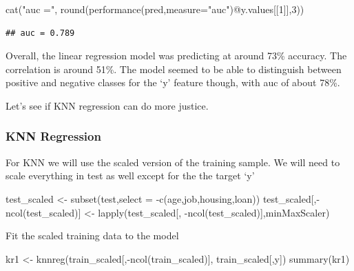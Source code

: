 \documentclass[
]{article}
\newenvironment{Shaded}{\begin{snugshade}}{\end{snugshade}}
\newcommand{\AttributeTok}[1]{\textcolor[rgb]{0.77,0.63,0.00}{#1}}
\newcommand{\DecValTok}[1]{\textcolor[rgb]{0.00,0.00,0.81}{#1}}
\newcommand{\FunctionTok}[1]{\textcolor[rgb]{0.00,0.00,0.00}{#1}}
\newcommand{\NormalTok}[1]{#1}
\newcommand{\OtherTok}[1]{\textcolor[rgb]{0.56,0.35,0.01}{#1}}
\newcommand{\SpecialCharTok}[1]{\textcolor[rgb]{0.00,0.00,0.00}{#1}}
\newcommand{\StringTok}[1]{\textcolor[rgb]{0.31,0.60,0.02}{#1}}
\begin{document}
\begin{Shaded}
\begin{Highlighting}[]
\FunctionTok{cat}\NormalTok{(}\StringTok{"auc ="}\NormalTok{, }\FunctionTok{round}\NormalTok{(}\FunctionTok{performance}\NormalTok{(pred,}\AttributeTok{measure=}\StringTok{"auc"}\NormalTok{)}\SpecialCharTok{@}\NormalTok{y.values[[}\DecValTok{1}\NormalTok{]],}\DecValTok{3}\NormalTok{))}
\end{Highlighting}
\end{Shaded}

\begin{verbatim}
## auc = 0.789
\end{verbatim}

Overall, the linear regression model was predicting at around 73\%
accuracy. The correlation is around 51\%. The model seemed to be able to
distinguish between positive and negative classes for the `y' feature
though, with auc of about 78\%.

Let's see if KNN regression can do more justice.

\hypertarget{knn-regression}{%
\subsubsection{KNN Regression}\label{knn-regression}}

For KNN we will use the scaled version of the training sample. We will
need to scale everything in test as well except for the the target `y'

\begin{Shaded}
\begin{Highlighting}[]
\NormalTok{test\_scaled }\OtherTok{\textless{}{-}} \FunctionTok{subset}\NormalTok{(test,}\AttributeTok{select =} \SpecialCharTok{{-}}\FunctionTok{c}\NormalTok{(age,job,housing,loan))}
\NormalTok{test\_scaled[,}\SpecialCharTok{{-}}\FunctionTok{ncol}\NormalTok{(test\_scaled)] }\OtherTok{\textless{}{-}} \FunctionTok{lapply}\NormalTok{(test\_scaled[, }\SpecialCharTok{{-}}\FunctionTok{ncol}\NormalTok{(test\_scaled)],minMaxScaler)}
\end{Highlighting}
\end{Shaded}

Fit the scaled training data to the model

\begin{Shaded}
\begin{Highlighting}[]
\NormalTok{kr1 }\OtherTok{\textless{}{-}} \FunctionTok{knnreg}\NormalTok{(train\_scaled[,}\SpecialCharTok{{-}}\FunctionTok{ncol}\NormalTok{(train\_scaled)], train\_scaled[,}\StringTok{\textquotesingle{}y\textquotesingle{}}\NormalTok{])}
\FunctionTok{summary}\NormalTok{(kr1)}
\end{Highlighting}
\end{Shaded}
\end{document}
